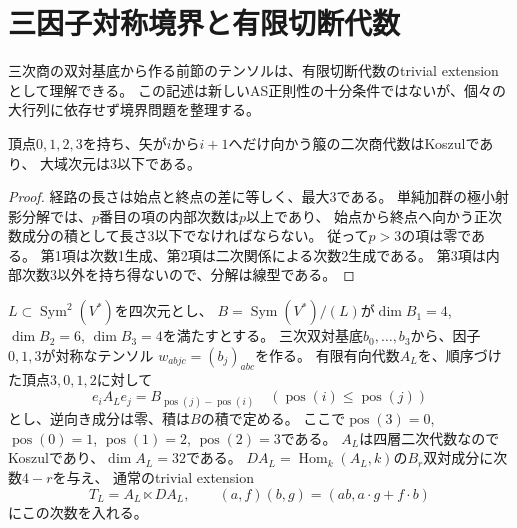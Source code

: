 \section{三因子対称境界と有限切断代数}
\label{sec:truncated-quadric-boundary}
三次商の双対基底から作る前節のテンソルは、有限切断代数のtrivial extensionとして理解できる。
この記述は新しいAS正則性の十分条件ではないが、個々の大行列に依存せず境界問題を整理する。

\begin{lemma}[四層二次代数のKoszul性]\label{lem:four-layer-koszul}
頂点$0,1,2,3$を持ち、矢が$i$から$i+1$へだけ向かう箙の二次商代数はKoszulであり、
大域次元は3以下である。
\end{lemma}
\begin{proof}
経路の長さは始点と終点の差に等しく、最大3である。
単純加群の極小射影分解では、$p$番目の項の内部次数は$p$以上であり、
始点から終点へ向かう正次数成分の積として長さ3以下でなければならない。
従って$p>3$の項は零である。
第1項は次数1生成、第2項は二次関係による次数2生成である。
第3項は内部次数3以外を持ち得ないので、分解は線型である。
\end{proof}

$L\subset\operatorname{Sym}^2(V^*)$を四次元とし、
$B=\operatorname{Sym}(V^*)/(L)$が$\dim B_1=4$, $\dim B_2=6$, $\dim B_3=4$を満たすとする。
三次双対基底$b_0,\ldots,b_3$から、因子$0,1,3$が対称なテンソル
$w_{abjc}=(b_j)_{abc}$を作る。
有限有向代数$A_L$を、順序づけた頂点$3,0,1,2$に対して
\[
 e_iA_Le_j=B_{\operatorname{pos}(j)-\operatorname{pos}(i)}
 \quad(\operatorname{pos}(i)\leq\operatorname{pos}(j))
\]
とし、逆向き成分は零、積は$B$の積で定める。
ここで$\operatorname{pos}(3)=0$, $\operatorname{pos}(0)=1$,
$\operatorname{pos}(1)=2$, $\operatorname{pos}(2)=3$である。
$A_L$は四層二次代数なのでKoszulであり、$\dim A_L=32$である。
$D A_L=\operatorname{Hom}_k(A_L,k)$の$B_r$双対成分に次数$4-r$を与え、
通常のtrivial extension
\[
 T_L=A_L\ltimes D A_L,
 \qquad (a,f)(b,g)=(ab,a\cdot g+f\cdot b)
\]
にこの次数を入れる。

